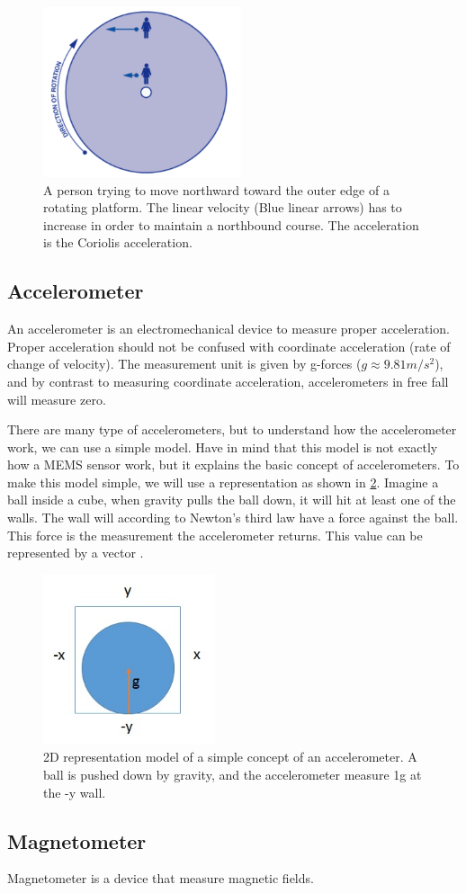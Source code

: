 \begin{figure}[ht]
    \centering
    \includegraphics[height=5cm]{images/coriolis_acceleration.jpg}
    \caption[Coriolis Acceleration Example]{A person trying to move northward toward the outer edge of a rotating platform. The linear velocity (Blue linear arrows) has to increase in order to maintain a northbound course. The acceleration is the Coriolis acceleration.}
    \label{fig:coriolis_acceleration}
\end{figure}


\subsection{Accelerometer}
An accelerometer is an electromechanical device to measure proper acceleration. Proper acceleration should not be confused with coordinate acceleration (rate of change of velocity). The measurement unit is given by g-forces ($g \approx 9.81m/s^{2}$), and by contrast to measuring coordinate acceleration, accelerometers in free fall will measure zero. 

There are many type of accelerometers, but to understand how the accelerometer work, we can use a simple model. Have in mind that this model is not exactly how a MEMS sensor work, but it explains the basic concept of accelerometers. To make this model simple, we will use a representation as shown in \cref{fig:accelerometer_model}. Imagine a ball inside a cube, when gravity pulls the ball down, it will hit at least one of the walls. The wall will according to Newton's third law have a force against the ball. This force is the measurement the accelerometer returns. This value can be represented by a vector \cite{IMU_guide}.

\begin{figure}[ht]
    \centering
    \includegraphics[height=5cm]{images/accelerometer.jpg}
    \caption[Accelerometer model]{2D representation model of a simple concept of an accelerometer. A ball is pushed down by gravity, and the accelerometer measure 1g at the -y wall.}
    \label{fig:accelerometer_model}
\end{figure}

\subsection{Magnetometer}
Magnetometer is a device that measure magnetic fields.